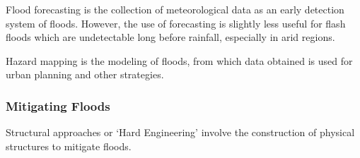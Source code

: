 \documentclass[../../main]{subfiles}
\begin{document}
	Flood forecasting is the collection of meteorological data as an early detection system of floods. However, the use of forecasting is slightly less useful for flash floods which are undetectable long before rainfall, especially in arid regions.


	Hazard mapping is the modeling of floods, from which data obtained is used for urban planning and other strategies.

\subsubsection{Mitigating Floods}

	Structural approaches or `Hard Engineering' involve the construction of physical structures to mitigate floods.
\end{document}
